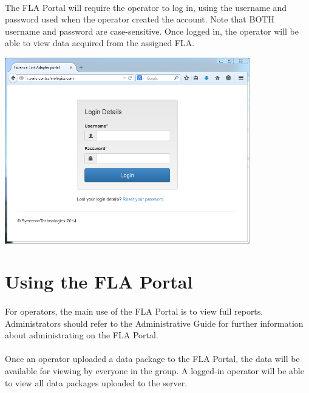 \documentclass[11pt, oneside]{book}
\begin{document}
\noindent\begin{minipage}{0.45\textwidth}%
	\paragraph{  }
The FLA Portal will require the operator to log in, using the username and password used when the operator created the account. Note that BOTH username and password are case-sensitive.
Once logged in, the operator will be able to view data acquired from
the assigned FLA.
\end{minipage}%
\hfill%
\begin{minipage}{0.45\textwidth} 
\includegraphics[width=0.8\textwidth]{../media/fla_portal_screenshots/login_screen}
\end{minipage}


\section{Using the FLA Portal}
\paragraph{  }
For operators, the main use of the FLA Portal is to view full reports. Administrators should refer to the Administrative Guide for further information about administrating on the FLA Portal.
\paragraph{  }
Once an operator uploaded a data package to the FLA Portal, the data will be available for viewing by everyone in the group. A logged-in operator
will be able to view all data packages uploaded to the server.
\end{document}
